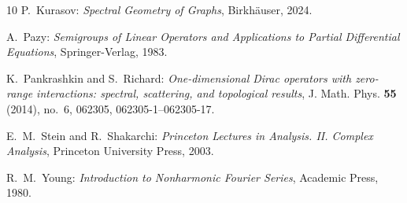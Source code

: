 \documentclass[11pt, a4paper,reqno]{amsart}
\theoremstyle{plain}
\theoremstyle{definition}
\theoremstyle{remark}
\newcommand{\1}{\mathds 1}
\begin{document}
\begin{thebibliography}{10}
P.~Kurasov: \emph{Spectral Geometry of Graphs}, Birkh\"auser, 2024.

A.~Pazy: \emph{Semigroups of Linear Operators and Applications to Partial Differential Equations}, Springer-Verlag, 1983.

K.~Pankrashkin and S.~Richard: \emph{One-dimensional Dirac operators with zero-range interactions: spectral, scattering, and topological results}, J. Math. Phys. \textbf{55} (2014), no.~6, 062305, 062305-1--062305-17.

E.~M.~Stein and R.~Shakarchi: \emph{Princeton Lectures in Analysis. {II}. {C}omplex {A}nalysis}, Princeton University Press, 2003.

R.~M.~Young: \emph{Introduction to Nonharmonic Fourier Series}, Academic Press, 1980.



\end{thebibliography}
%
\end{document}
